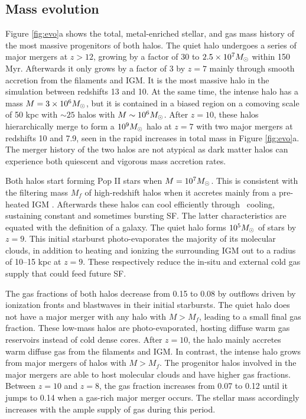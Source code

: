 \documentclass{PoS}
\begin{document}
\subsection{Mass evolution}
\label{sec:halo}


Figure \ref{fig:evo}a shows the total, metal-enriched stellar, and gas
mass history of the most massive progenitors of both halos.  The quiet
halo undergoes a series of major mergers at $z > 12$, growing by a
factor of 30 to $2.5 \times 10^7 \Ms$ within 150 Myr.  Afterwards it
only grows by a factor of 3 by $z=7$ mainly through smooth accretion
from the filaments and IGM.  It is the most massive halo in the
simulation between redshifts 13 and 10.  At the same time, the intense
halo has a mass $M = 3 \times 10^6 \Ms$, but it is contained in a
biased region on a comoving scale of 50 kpc with $\sim25$ halos with
$M \sim 10^6 \Ms$.  After $z=10$, these halos hierarchically merge to
form a $10^9 \Ms$ halo at $z=7$ with two major mergers at redshifts 10
and 7.9, seen in the rapid increases in total mass in Figure
\ref{fig:evo}a.  The merger history of the two halos are not atypical
as dark matter halos can experience both quiescent and vigorous mass
accretion rates.

Both halos start forming Pop II stars when $M = 10^7 \Ms$.  This is
consistent with the filtering mass $M_f$ of high-redshift halos when
it accretes mainly from a pre-heated IGM \citep{gnedin98, gnedin00,
  Wise08_Gal}.  Afterwards these halos can cool efficiently through
\hh~cooling, sustaining constant and sometimes bursting SF.  The
latter characteristics are equated with the definition of a galaxy.
The quiet halo forms $10^5 \Ms$ of stars by $z=9$.  This initial
starburst photo-evaporates the majority of its molecular clouds, in
addition to heating and ionizing the surrounding IGM out to a radius
of 10--15 kpc at $z=9$.  These respectively reduce the in-situ and
external cold gas supply that could feed future SF.

The gas fractions of both halos decrease from 0.15 to 0.08 by outflows
driven by ionization fronts and blastwaves in their initial
starbursts.  The quiet halo does not have a major merger with any halo
with $M > M_f$, leading to a small final gas fraction.  These low-mass
halos are photo-evaporated, hosting diffuse warm gas reservoirs
instead of cold dense cores.  After $z=10$, the halo mainly accretes
warm diffuse gas from the filaments and IGM.  In contrast, the intense
halo grows from major mergers of halos with $M > M_f$.  The progenitor
halos involved in the major mergers are able to host molecular clouds
and have higher gas fractions.  Between $z=10$ and $z=8$, the gas
fraction increases from 0.07 to 0.12 until it jumps to 0.14 when a
gas-rich major merger occurs.  The stellar mass accordingly increases
with the ample supply of gas during this period.  
\end{document}

